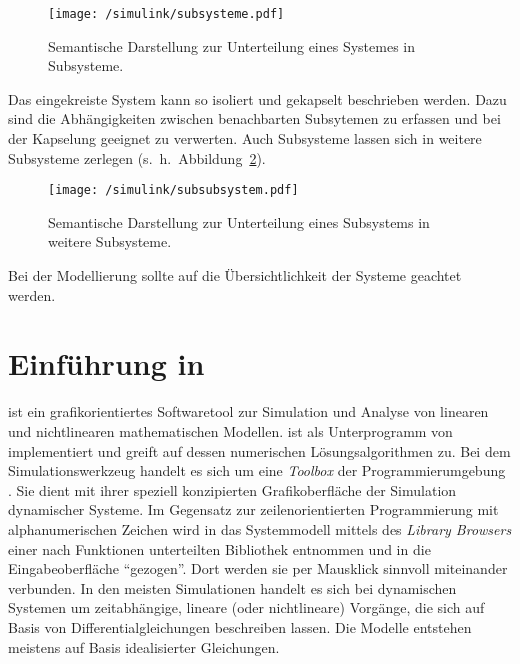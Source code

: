 \begin{figure}[h!]
	\centering
	\texttt{[image: /simulink/subsysteme.pdf]}
	\label{fig:subsysteme}
	\caption{Semantische Darstellung zur Unterteilung eines Systemes in Subsysteme.}
\end{figure}

Das eingekreiste System kann so isoliert und gekapselt beschrieben werden.
Dazu sind die Abhängigkeiten zwischen benachbarten Subsytemen zu erfassen und bei der Kapselung geeignet zu verwerten.
Auch Subsysteme lassen sich in weitere Subsysteme zerlegen (s.~h.~Abbildung~\ref{fig:subsubsysteme}).

\begin{figure}[h!]
	\centering
	\texttt{[image: /simulink/subsubsystem.pdf]}
	\label{fig:subsubsysteme}
	\caption{Semantische Darstellung zur Unterteilung eines Subsystems in weitere Subsysteme.}
\end{figure}

Bei der Modellierung sollte auf die Übersichtlichkeit der Systeme geachtet werden.

\section{Einführung in }\label{sec:simulink}

 ist ein grafikorientiertes Softwaretool zur Simulation und Analyse von linearen und nichtlinearen mathematischen Modellen.
 ist als Unterprogramm von  implementiert und greift auf dessen numerischen Lösungsalgorithmen zu.
Bei dem Simulationswerkzeug  handelt es sich um eine \emph{Toolbox} der Programmierumgebung .
Sie dient mit ihrer speziell konzipierten Grafikoberfläche der Simulation dynamischer Systeme.
Im Gegensatz zur zeilenorientierten Programmierung mit alphanumerischen Zeichen wird in  das Systemmodell mittels des \emph{ Library Browsers} einer nach Funktionen unterteilten Bibliothek entnommen und in die Eingabeoberfläche \enquote{gezogen}.
Dort werden sie per Mausklick sinnvoll miteinander verbunden.
In den meisten Simulationen handelt es sich bei dynamischen Systemen um zeitabhängige, lineare (oder nichtlineare) Vorgänge, die sich auf Basis von Differentialgleichungen beschreiben lassen.
Die Modelle entstehen meistens auf Basis idealisierter Gleichungen.

